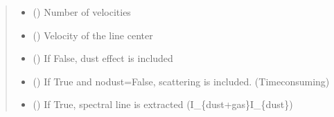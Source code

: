 \documentclass[a4paper,11pt,english]{sphinxmanual}
\begin{document}
\begin{fulllineitems}
\begin{fulllineitems}
\begin{quote}
\begin{description}
\begin{itemize}
\item {} 
\sphinxAtStartPar
{} () \textendash{} Number of velocities

\item {} 
\sphinxAtStartPar
{} () \textendash{} Velocity of the line center

\item {} 
\sphinxAtStartPar
{} () \textendash{} If False, dust effect is included

\item {} 
\sphinxAtStartPar
{} () \textendash{} If True and nodust=False, scattering is included. (Time\sphinxhyphen{}consuming)

\item {} 
\sphinxAtStartPar
{} () \textendash{} If True, spectral line is extracted (I\_\{dust+gas\}\sphinxhyphen{}I\_\{dust\})

\end{itemize}

\end{description}\end{quote}

\end{fulllineitems}



\end{fulllineitems}
\end{document}
